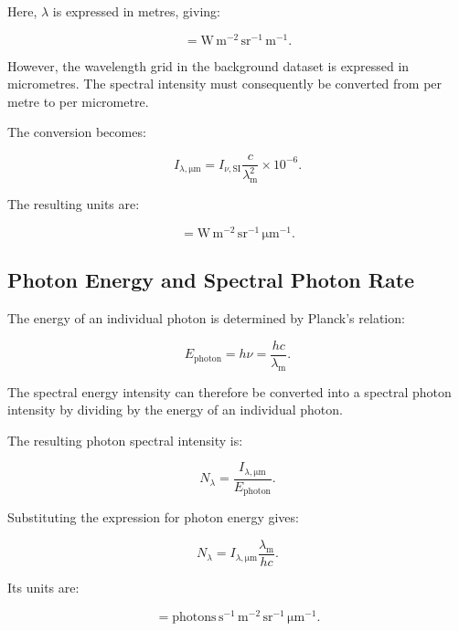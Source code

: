 \documentclass{article}
\begin{document}
Here, $\lambda$ is expressed in metres, giving:

\begin{equation}
[I_{\lambda}]
=
\mathrm{W\,m^{-2}\,sr^{-1}\,m^{-1}}.
\end{equation}

However, the wavelength grid in the background dataset is expressed in micrometres. The spectral intensity must consequently be converted from per metre to per micrometre.


The conversion becomes:

\begin{equation}
I_{\lambda,\mathrm{\mu m}}
=
I_{\nu,\mathrm{SI}}
\frac{c}{\lambda_{\mathrm{m}}^2}
\times 10^{-6}.
\end{equation}

The resulting units are:

\begin{equation}
[I_{\lambda,\mathrm{\mu m}}]
=
\mathrm{W\,m^{-2}\,sr^{-1}\,\mu m^{-1}}.
\end{equation}

\subsection{Photon Energy and Spectral Photon Rate}

The energy of an individual photon is determined by Planck's relation:

\begin{equation}
E_{\mathrm{photon}}
=
h\nu
=
\frac{hc}{\lambda_{\mathrm{m}}}.
\end{equation}

The spectral energy intensity can therefore be converted into a spectral photon intensity by dividing by the energy of an individual photon.

The resulting photon spectral intensity is:

\begin{equation}
N_{\lambda}
=
\frac{I_{\lambda,\mathrm{\mu m}}}
{E_{\mathrm{photon}}}.
\end{equation}

Substituting the expression for photon energy gives:

\begin{equation}
N_{\lambda}
=
I_{\lambda,\mathrm{\mu m}}
\frac{\lambda_{\mathrm{m}}}{hc}.
\end{equation}

Its units are:

\begin{equation}
[N_{\lambda}]
=
\mathrm{photons\,s^{-1}\,m^{-2}\,sr^{-1}\,\mu m^{-1}}.
\end{equation}
\end{document}
